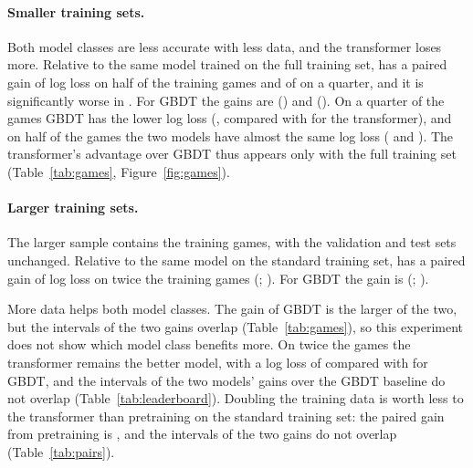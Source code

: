 \documentclass[11pt]{article}
\begin{document}


\ifgames
\paragraph{Smaller training sets.}
Both model classes are less accurate with less data, and the transformer
loses more. Relative to the same model trained on the full training set,
 has a paired gain of
 log loss
on half of the training games and of
 on a
quarter, and it is significantly worse in
. For GBDT the gains are
() and
(). On a quarter of the games GBDT
has the lower log loss (, compared with
 for the transformer), and on
half of the games the two models have almost the same log loss
( and ). The transformer's advantage over
GBDT thus appears only with the full training set (Table~\ref{tab:games},
Figure~\ref{fig:games}).
\fi

\ifmore
\paragraph{Larger training sets.}
The larger sample contains  the training games, with
the validation and test sets unchanged. Relative to the same model on the
standard training set,  has a paired gain of
 log loss
on twice the training games
(;
). For
GBDT the gain is 
(;
).

More data helps both model classes. The gain of GBDT is the larger of the
two, but the intervals of the two gains overlap (Table~\ref{tab:games}), so
this experiment does not show which model class benefits more. On twice the
games the transformer remains the better model, with a log loss of
 compared with
 for GBDT, and the intervals of the two models'
gains over the GBDT baseline do not overlap (Table~\ref{tab:leaderboard}).
\ifchangestart
Doubling the training data is worth less to the transformer than pretraining
on the standard training set: the paired gain from pretraining is
, and
the intervals of the two gains do not overlap (Table~\ref{tab:pairs}).
\fi
\end{document}
